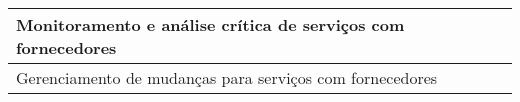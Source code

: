 \documentclass[portuguese,oneside]{tcc}
\begin{document}
\begin{table}[!t]
\begin{center}
\begin{tabular}{|l|}
Monitoramento e análise crítica de serviços com fornecedores                                                                                                                                                                              \\ \hline
Gerenciamento de mudanças para serviços com fornecedores                                                                                                                                                                                  \\ \hline
\end{tabular}
\end{center}
\end{table}

\end{document}

